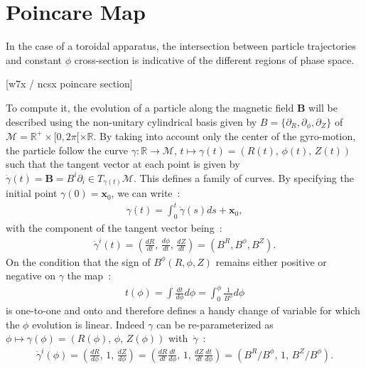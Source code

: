 \chapter{Poincare Map}
In the case of a toroidal apparatus, the intersection between particle trajectories and constant $\phi$ cross-section is indicative of the different regions of phase space.

[w7x / ncsx poincare section]

To compute it, the evolution of a particle along the magnetic field $\textbf{B}$ will be described using the non-unitary cylindrical basis given by $B =\{\partial_R, \partial_\phi, \partial_Z\}$ of $\mathcal{M} = \mathbb{R}^+\times[0,2\pi[\times\mathbb{R}$. By taking into account only the center of the gyro-motion, the particle follow the curve $\gamma : \mathbb{R}\rightarrow\mathcal{M}$, $t \mapsto \gamma(t) = (R(t),\,\phi(t),\,Z(t))$ such that the tangent vector at each point is given by $\dot{\gamma}(t)= \textbf{B} = B^i\partial_i \in T_{\gamma(t)}\mathcal{M}$. This defines a family of curves. By specifying the initial point $\gamma(0) = \textbf{x}_0$, we can write~:
\begin{align*}
    \gamma(t) = \int_0^t\dot{\gamma}(s)ds + \textbf{x}_0,
\end{align*}
with the component of the tangent vector being~:
\begin{align*}
    \dot{\gamma}^i(t)= (\frac{dR}{dt},\,\frac{d\phi}{dt},\,\frac{dZ}{dt}) = (B^R, B^\phi, B^Z).
\end{align*}
On the condition that the sign of $B^\phi(R, \phi, Z)$ remains either positive or negative on $\gamma$ the map~:
\begin{align*}
    t(\phi) = \int \frac{dt}{d\phi}d\phi = \int_0^\phi \frac{1}{B^\phi}d\phi
\end{align*}
is one-to-one and onto and therefore defines a handy change of variable for which the $\phi$ evolution is linear. Indeed $\gamma$ can be re-parameterized as $\phi \mapsto \gamma(\phi) = (R(\phi),\,\phi,\,Z(\phi))$ with~$\dot{\gamma}$~:
\begin{align*}
    \dot{\gamma}^i(\phi) = (\frac{dR}{d\phi},\,1,\,\frac{dZ}{d\phi}) = (\frac{dR}{dt}\frac{dt}{d\phi},\,1,\,\frac{dZ}{dt}\frac{dt}{d\phi}) = (B^R/B^\phi,\, 1,\,B^Z/B^\phi).
\end{align*}

